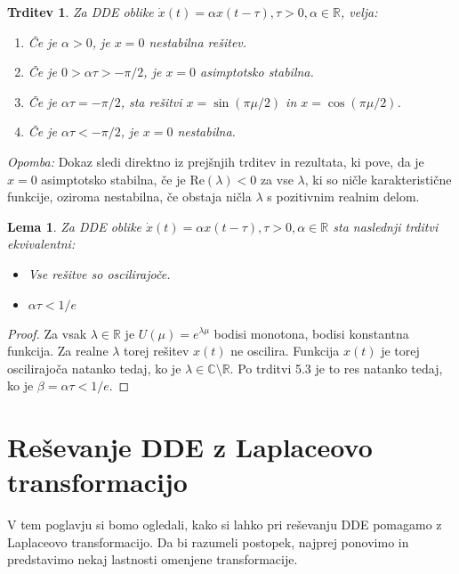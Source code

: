 \documentclass[12pt,a4paper]{amsart}
\theoremstyle{definition} %
\theoremstyle{plain} %
\newtheorem{lema}[definicija]{Lema}
\newtheorem{trditev}[definicija]{Trditev}
\newcommand{\R}{\mathbb R}
\begin{document}
\begin{trditev}
    Za DDE oblike $\dot{x}(t)= \alpha x(t-\tau), \tau >0, \alpha \in \R$, velja:
    \begin{enumerate}
        \item Če je $\alpha > 0$, je $x=0$ nestabilna rešitev.
        \item Če je $0>\alpha \tau >-\pi/2$, je $x=0$ asimptotsko stabilna.
        \item Če je $\alpha \tau = -\pi/2$, sta rešitvi $x=\sin(\pi\mu/2)$ in $x=\cos(\pi\mu/2)$.
        \item Če je $\alpha\tau < -\pi/2$, je $x=0$ nestabilna.
    \end{enumerate}
\end{trditev}

\noindent \textit{Opomba: }Dokaz sledi direktno iz prejšnjih trditev in rezultata, ki pove, da je $x=0$ asimptotsko stabilna, če 
je $\text{Re}(\lambda) < 0$ za vse $\lambda$, ki so ničle karakteristične funkcije, oziroma nestabilna,
če obstaja ničla $\lambda$ s pozitivnim realnim delom.

\begin{lema}
    Za DDE oblike $\dot{x}(t)= \alpha x(t-\tau), \tau >0, \alpha \in \R$ sta naslednji trditvi
    ekvivalentni:
    \begin{itemize}
        \item Vse rešitve so oscilirajoče.
        \item $\alpha\tau < 1/e$
    \end{itemize}
\end{lema}

\begin{proof}
    Za vsak $\lambda \in \R$ je $U(\mu)=e^{\lambda\mu}$ bodisi monotona, bodisi konstantna funkcija.
    Za realne $\lambda$ torej rešitev $x(t)$ ne oscilira. Funkcija $x(t)$ je torej oscilirajoča natanko tedaj, ko
    je $\lambda\in\mathbb{C}\setminus\mathbb{R}$. Po trditvi 5.3 je to res natanko tedaj, ko je 
    $\beta = \alpha\tau < 1/e$.
\end{proof}

\section{Reševanje DDE z Laplaceovo transformacijo}

V tem poglavju si bomo ogledali, kako si lahko pri reševanju DDE pomagamo z Laplaceovo transformacijo.
Da bi razumeli postopek, najprej ponovimo in predstavimo nekaj lastnosti omenjene transformacije.
\end{document}
